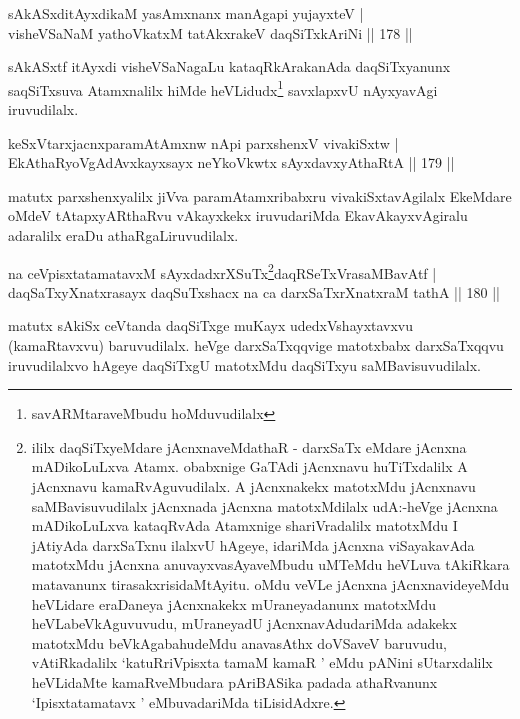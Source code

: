 \vskip 5pt
\begin{shl}
sAkASxditAyxdikaM yasAmxnanx manAgapi yujayxteV |\\
visheVSaNaM yathoVkatxM tatAkxrakeV daqSiTxkAriNi \hfill || 178 ||
\end{shl}
\vskip 5pt
\begin{artha}
sAkASxtf itAyxdi visheVSaNagaLu kataqRkArakanAda daqSiTxyanunx saqSiTxsuva Atamxnalilx hiMde heVLidudx\footnote{savARMtaraveMbudu hoMduvudilalx} savxlapxvU nAyxyavAgi iruvudilalx.
\end{artha}
\vskip 5pt
\begin{shl}
keSxVtarxjacnxparamAtAmxnw nApi parxshenxV vivakiSxtw |\\
EkAthaRyoVgAdAvxkayxsayx neYkoVkwtx sAyxdavxyAthaRtA \hfill || 179 ||
\end{shl}
\vskip 5pt
\begin{artha}%
matutx parxshenxyalilx jiVva paramAtamxribabxru vivakiSxtavAgilalx EkeMdare oMdeV tAtapxyARthaRvu vAkayxkekx iruvudariMda EkavAkayxvAgiralu adaralilx eraDu athaRgaLiruvudilalx.
\end{artha}
\vskip 5pt
\begin{shl}
na ceVpisxtatamatavxM sAyxdadxrXSuTx\footnote{ililx daqSiTxyeMdare jAcnxnaveMdathaR - darxSaTx eMdare jAcnxna mADikoLuLxva Atamx. obabxnige GaTAdi jAcnxnavu huTiTxdalilx A jAcnxnavu kamaRvAguvudilalx. A jAcnxnakekx matotxMdu jAcnxnavu saMBavisuvudilalx jAcnxnada jAcnxna matotxMdilalx udA:-heVge jAcnxna mADikoLuLxva kataqRvAda Atamxnige shariVradalilx matotxMdu I jAtiyAda darxSaTxnu ilalxvU hAgeye, idariMda jAcnxna viSayakavAda matotxMdu jAcnxna anuvayxvasAyaveMbudu uMTeMdu heVLuva tAkiRkara matavanunx tirasakxrisidaMtAyitu. oMdu veVLe jAcnxna jAcnxnavideyeMdu heVLidare eraDaneya jAcnxnakekx mUraneyadanunx matotxMdu heVLabeVkAguvuvudu, mUraneyadU jAcnxnavAdudariMda adakekx matotxMdu beVkAgabahudeMdu anavasAthx doVSaveV baruvudu, vAtiRkadalilx `katuRriVpisxta tamaM kamaR ' eMdu pANini sUtarxdalilx heVLidaMte kamaR\-\break veMbudara pAriBASika padada athaRvanunx `Ipisxtatamatavx ' eMbuvadariMda tiLisidAdxre.}daqRSeTxVrasaMBavAtf |\\
daqSaTxyXnatxrasayx daqSuTxshacx na ca darxSaTxrXnatxraM tathA \hfill || 180 ||
\end{shl}
\vskip 5pt
\begin{artha}
matutx sAkiSx ceVtanda daqSiTxge muKayx udedxVshayxtavxvu (kamaRtavxvu) baruvudilalx. heVge darxSaTxqqvige matotxbabx darxSaTxqqvu iruvudilalxvo hAgeye daqSiTxgU matotxMdu daqSiTxyu saMBavisuvudilalx.
\end{artha}
